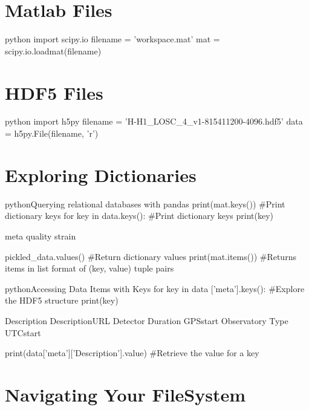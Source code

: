 \section{Matlab Files}

\begin{codebox}{python}{}
import scipy.io
filename = 'workspace.mat'
mat = scipy.io.loadmat(filename)
\end{codebox}


\section{HDF5 Files}

\begin{codebox}{python}{}
import h5py
filename = 'H-H1_LOSC_4_v1-815411200-4096.hdf5'
data = h5py.File(filename, 'r')
\end{codebox}


\section{Exploring Dictionaries}

\begin{codebox}{python}{Querying relational databases with pandas}
print(mat.keys())  #Print dictionary keys
for key in data.keys():  #Print dictionary keys
    print(key)

meta
quality
strain

pickled_data.values()  #Return dictionary values
print(mat.items())  #Returns items in list format of (key, value) tuple pairs
\end{codebox}

\begin{codebox}{python}{Accessing Data Items with Keys}
for key in data ['meta'].keys():  #Explore the HDF5 structure
    print(key)

Description
DescriptionURL
Detector
Duration
GPSstart
Observatory
Type
UTCstart

print(data['meta']['Description'].value)  #Retrieve the value for a key
\end{codebox}

\section{Navigating Your FileSystem}

